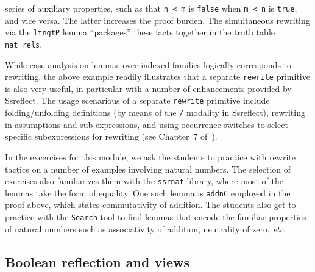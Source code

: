 \documentclass[blockstyle,preprint]{sigplanconf}
\newcommand{\is}[1]{\textcolor{blue}{(Ilya: {#1})}}
\newcommand{\an}[1]{\textcolor{red}{(Aleks: {#1})}}
\newcommand{\code}[1]{\lstinline{#1}}
\newcommand{\etc}{\emph{etc}}
\begin{document}
series of auxiliary properties, such as that \code{n < m} is
\code{false} when \code{m < n} is \code{true}, and vice versa. The
latter increases the proof burden. The simultaneous rewriting via the
\code{ltngtP} lemma ``packages'' these facts together in the truth
table \code{nat_rels}.
%

While case analysis on lemmas over indexed families logically
corresponds to rewriting, the above example readily illustrates that a
separate \code{rewrite} primitive is also very useful, in particular
with a number of enhancements provided by Ssreflect. The usage
scenarious of a separate \code{rewrite} primitive include
folding/unfolding definitions (by means of the \code{/} modality in
Ssreflect), rewriting in assumptions and sub-expressions, and using
occurrence switches to select specific subexpressions for rewriting
(see Chapter~7 of~\cite{Gonthier-al:TR}).
%

In the excercises for this module, we ask the students to practice
with rewrite tactics on a number of examples involving natural
numbers. The selection of exercises also familiarizes them with the
\code{ssrnat} library, where most of the lemmas take the form of
equality. One such lemma is \code{addnC} employed in the proof above,
which states commutativity of addition. The students also get to
practice with the \code{Search} tool to find lemmas that encode the
familiar properties of natural numbers such as associativity of
addition, neutrality of zero, \etc.

\subsection{Boolean reflection and views}
\label{sec:views}
%
\end{document}
